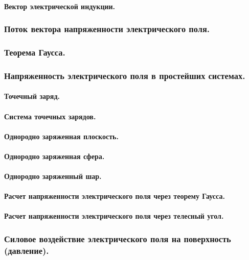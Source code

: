 \documentclass{article}
\begin{document}
            \paragraph{Вектор электрической индукции.}
        \subsubsection{Поток вектора напряженности электрического поля.}
        \subsubsection{Теорема Гаусса.}
        \subsubsection{Напряженность электрического поля в простейших системах.}
            \paragraph{Точечный заряд.}
            \paragraph{Система точечных зарядов.}
            \paragraph{Однородно заряженная плоскость.}
            \paragraph{Однородно заряженная сфера.}
            \paragraph{Однородно заряженный шар.}
            \paragraph{Расчет напряженности электрического поля через теорему Гаусса.}
            \paragraph{Расчет напряженности электрического поля через телесный угол.}
        \subsubsection{Силовое воздействие электрического поля на поверхность (давление).}
\end{document}
